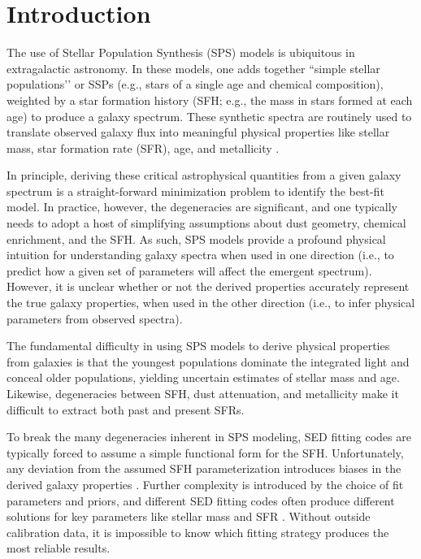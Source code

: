 \documentclass[preprint2]{aastex62}
\begin{document}
\section{Introduction} \label{sec:intro}

The use of Stellar Population Synthesis (SPS) models is ubiquitous in extragalactic astronomy. In these models, one adds together ``simple stellar populations’’ or SSPs (e.g., stars of a single age and chemical composition), weighted by a star formation history (SFH; e.g., the mass in stars formed at each age) to produce a galaxy spectrum. These synthetic spectra are routinely used to translate observed galaxy flux into meaningful physical properties like stellar mass, star formation rate (SFR), age, and metallicity \citep[see reviews in][]{Walcher+2011, Conroy+2013}.

In principle, deriving these critical astrophysical quantities from a given galaxy spectrum is a straight-forward minimization problem to identify the best-fit model. In practice, however, the degeneracies are significant, and one typically needs to adopt a host of simplifying assumptions about dust geometry, chemical enrichment, and the SFH. As such, SPS models provide a profound physical intuition for understanding galaxy spectra when used in one direction (i.e., to predict how a given set of parameters will affect the emergent spectrum). However, it is unclear whether or not the derived properties accurately represent the true galaxy properties, when used in the other direction (i.e., to infer physical parameters from observed spectra). 

The fundamental difficulty in using SPS models to derive physical properties from galaxies is that the youngest populations dominate the integrated light and conceal older populations, yielding uncertain estimates of stellar mass and age. Likewise, degeneracies between SFH, dust attenuation, and metallicity make it difficult to extract both past and present SFRs.

To break the many degeneracies inherent in SPS modeling, SED fitting codes are typically forced to assume a simple functional form for the SFH. Unfortunately, any deviation from the assumed SFH parameterization introduces biases in the derived galaxy properties \citep[e.g., ][]{Lee+2009, Maraston+2010, Pforr+2012}.  Further complexity is introduced by the choice of fit parameters and priors, and different SED fitting codes often produce different solutions for key parameters like stellar mass and SFR \citep[e.g, ][]{Santini+2015, Goddard+2017, Li+2017, Ge+2018}. Without outside calibration data, it is impossible to know which fitting strategy produces the most reliable results.
\end{document}
